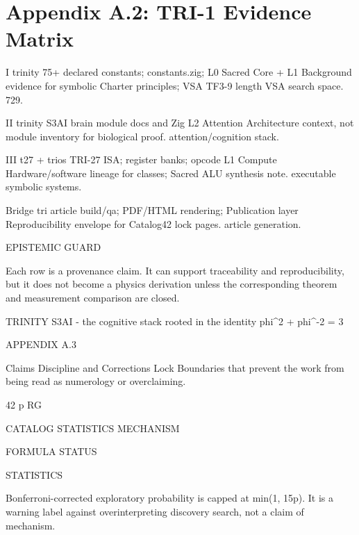 
\section{Appendix A.2: TRI-1 Evidence Matrix}

I                trinity                75+ declared constants; constants.zig;    L0 Sacred Core + L1         Background evidence for symbolic
                                         Charter principles; VSA TF3-9 length      VSA                         search space.
                                         729.

 II               trinity                S3AI brain module docs and Zig            L2 Attention                Architecture context, not
                                         module inventory for                                                  biological proof.
                                         attention/cognition stack.

 III              t27 + trios            TRI-27 ISA; register banks; opcode        L1 Compute                  Hardware/software lineage for
                                         classes; Sacred ALU synthesis note.                                   executable symbolic systems.

 Bridge           tri article            build/qa; PDF/HTML rendering;             Publication layer           Reproducibility envelope for
                                         Catalog42 lock pages.                                                 article generation.

     EPISTEMIC GUARD

     Each row is a provenance claim. It can support traceability and reproducibility, but it does not become a
     physics derivation unless the corresponding theorem and measurement comparison are closed.

                                TRINITY S3AI - the cognitive stack rooted in the identity phi^2 + phi^-2 = 3

                                                       APPENDIX A.3

    Claims Discipline and Corrections Lock
      Boundaries that prevent the work from being read as numerology or overclaiming.

                                    42                                       p                              RG

                                 CATALOG                               STATISTICS                         MECHANISM

  FORMULA STATUS

  STATISTICS

  Bonferroni-corrected exploratory probability is capped at min(1, 15p). It is a warning label against
  overinterpreting discovery search, not a claim of mechanism.